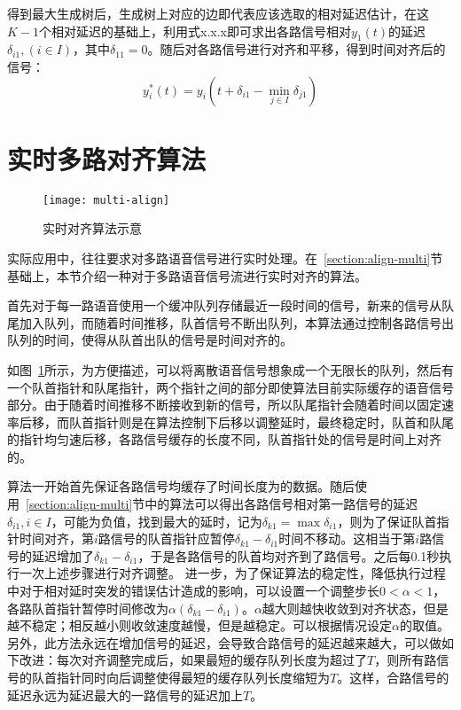 得到最大生成树后，生成树上对应的边即代表应该选取的相对延迟估计，在这$K-1$个相对延迟的基础上，利用式x.x.x即可求出各路信号相对$y_1 (t)$的延迟$\delta_{i1},(i \in I)$，其中$\delta_{11}=0$。随后对各路信号进行对齐和平移，得到时间对齐后的信号：
\begin{equation}
y_i^* (t)=y_i (t+\delta_{i1}-\min_{j\in I}\delta_{j1})
\end{equation}

\section{实时多路对齐算法} \label{section:realtime-align}

\begin{figure}
\centering
\texttt{[image: multi-align]}
\caption{实时对齐算法示意\label{fig:multi-align}}
\end{figure}

实际应用中，往往要求对多路语音信号进行实时处理。在~\ref{section:align-multi}节基础上，本节介绍一种对于多路语音信号流进行实时对齐的算法。

首先对于每一路语音使用一个缓冲队列存储最近一段时间的信号，新来的信号从队尾加入队列，而随着时间推移，队首信号不断出队列，本算法通过控制各路信号出队列的时间，使得从队首出队的信号是时间对齐的。

如图~\ref{fig:multi-align}所示，为方便描述，可以将离散语音信号想象成一个无限长的队列，然后有一个队首指针和队尾指针，两个指针之间的部分即使算法目前实际缓存的语音信号部分。由于随着时间推移不断接收到新的信号，所以队尾指针会随着时间以固定速率后移，而队首指针则是在算法控制下后移以调整延时，最终稳定时，队首和队尾的指针均匀速后移，各路信号缓存的长度不同，队首指针处的信号是时间上对齐的。

算法一开始首先保证各路信号均缓存了时间长度为的数据。随后使用~\ref{section:align-multi}节中的算法可以得出各路信号相对第一路信号的延迟$\delta_{i1}, i \in I$，可能为负值，找到最大的延时，记为$\delta_{k1} = \max \delta_{i1}$，则为了保证队首指针时间对齐，第$i$路信号的队首指针应暂停$\delta_{k1}-\delta_{i1}$时间不移动。这相当于第$i$路信号的延迟增加了$\delta_{k1}-\delta_{i1}$，于是各路信号的队首均对齐到了路信号。之后每0.1秒执行一次上述步骤进行对齐调整。
进一步，为了保证算法的稳定性，降低执行过程中对于相对延时突发的错误估计造成的影响，可以设置一个调整步长$0<\alpha<1$，各路队首指针暂停时间修改为$\alpha(\delta_{k1}-\delta_{i1})$。$\alpha$越大则越快收敛到对齐状态，但是越不稳定；相反越小则收敛速度越慢，但是越稳定。可以根据情况设定$\alpha$的取值。
另外，此方法永远在增加信号的延迟，会导致合路信号的延迟越来越大，可以做如下改进：每次对齐调整完成后，如果最短的缓存队列长度为超过了$T$，则所有路信号的队首指针同时向后调整使得最短的缓存队列长度缩短为$T$。这样，合路信号的延迟永远为延迟最大的一路信号的延迟加上$T$。

